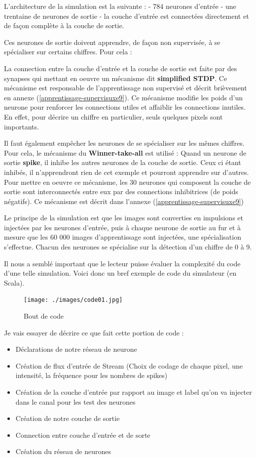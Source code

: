 L'architecture de la simulation est la suivante : - 784 neurones
d'entrée - une trentaine de neurones de sortie - la couche d'entrée est
connectées directement et de façon complète à la couche de sortie.

Ces neurones de sortie doivent apprendre, de façon non supervisée, à se
spécialiser sur certains chiffres. Pour cela :

La connection entre la couche d'entrée et la couche de sortie est faite
par des synapses qui mettant en oeuvre un mécanisme dit
\textbf{simplified STDP}. Ce mécanisme est responsable de
l'apprentissage non supervisé et décrit brièvement en annexe
(\ref{apprentissage-supervisuxe9}). Ce mécanisme modifie les poids d'un
neurone pour renforcer les connections utiles et affaiblir les
connections inutiles. En effet, pour décrire un chiffre en particulier,
seuls quelques pixels sont importants.

Il faut également empêcher les neurones de se spécialiser sur les mêmes
chiffres. Pour cela, le mécanisme du \textbf{Winner-take-all} est
utilisé : Quand un neurone de sortie \textbf{spike}, il inhibe les
autres neurones de la couche de sortie. Ceux ci étant inhibés, il
n'apprendront rien de cet exemple et pourront apprendre sur d'autres.
Pour mettre en oeuvre ce mécanisme, les 30 neurones qui composent la
couche de sortie sont interconnectés entre eux par des connections
inhibitrices (de poids négatifs). Ce mécanisme est décrit dans l'annexe
(\ref{apprentissage-supervisuxe9})

Le principe de la simulation est que les images sont converties en
impulsions et injectées par les neurones d'entrée, puis à chaque neurone
de sortie au fur et à mesure que les 60 000 images d'apprentissage sont
injectées, une spécialisation s'effectue. Chacun des neurones se
spécialise sur la détection d'un chiffre de 0 à 9.

Il nous a semblé important que le lecteur puisse évaluer la complexité
du code d'une telle simulation. Voici donc un bref exemple de code du
simulateur (en Scala).

\begin{figure}[h!]
\label{fig:code}
\centering
\texttt{[image: ./images/code01.jpg]}
\caption{Bout de code}
\end{figure}

Je vais essayer de décrire ce que fait cette portion de code :

\begin{itemize}
\tightlist
\item
  Déclarations de notre réseau de neurone
\item
  Création de flux d'entrée de Stream (Choix de codage de chaque pixel,
  une intensité, la fréquence pour les nombres de spikes)
\item
  Création de la couche d'entrée par rapport au image et label qu'on va
  injecter dans le canal pour les test des neurones
\item
  Création de notre couche de sortie
\item
  Connection entre couche d'entrée et de sorte
\item
  Création du réseau de neurones
\end{itemize}

